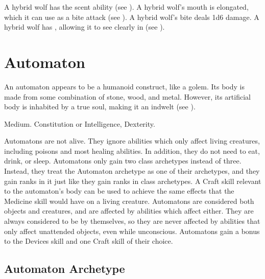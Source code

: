 
\begin{itemize}
	 A hybrid wolf has the scent ability (see ).
	 A hybrid wolf's mouth is elongated, which it can use as a bite attack (see ).
	      A hybrid wolf's bite deals 1d6 damage.
	 A hybrid wolf has , allowing it to see clearly in  (see ).
\end{itemize}

\section{Automaton}
An automaton appears to be a humanoid construct, like a golem.
Its body is made from some combination of stone, wood, and metal.
However, its artificial body is inhabited by a true soul, making it an indwelt (see ).

 Medium.
  Constitution or Intelligence,  Dexterity.
\begin{itemize}
	 Automatons are not alive. They ignore abilities which only affect living creatures, including poisons and most healing abilities. In addition, they do not need to eat, drink, or sleep.
	 Automatons only gain two class archetypes instead of three.
	      Instead, they treat the Automaton archetype as one of their archetypes, and they gain ranks in it just like they gain ranks in class archetypes.
	 A Craft skill relevant to the automaton's body can be used to achieve the same effects that the Medicine skill would have on a living creature.
	 Automatons are considered both objects and creatures, and are affected by abilities which affect either.
	      They are always considered to be  by themselves, so they are never affected by abilities that only affect unattended objects, even while unconscious.
	 Automatons gain a  bonus to the Devices skill and one Craft skill of their choice.
\end{itemize}

\subsection{Automaton Archetype}


